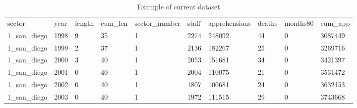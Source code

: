 \begin{table}[]
\caption{Example of current dataset}
\label{tab:data_example_current}
\begin{tabular}{llllllllll}
sector        & year & length & cum\_len & sector\_number & staff & apprehensions & deaths & months80 & cum\_app \\
1\_san\_diego & 1998 & 9      & 35       & 1              & 2274  & 248092        & 44     & 0        & 3087449  \\
1\_san\_diego & 1999 & 2      & 37       & 1              & 2136  & 182267        & 25     & 0        & 3269716  \\
1\_san\_diego & 2000 & 3      & 40       & 1              & 2053  & 151681        & 34     & 0        & 3421397  \\
1\_san\_diego & 2001 & 0      & 40       & 1              & 2004  & 110075        & 21     & 0        & 3531472  \\
1\_san\_diego & 2002 & 0      & 40       & 1              & 1807  & 100681        & 24     & 0        & 3632153  \\
1\_san\_diego & 2003 & 0      & 40       & 1              & 1972  & 111515        & 29     & 0        & 3743668 
\end{tabular}
\end{table}